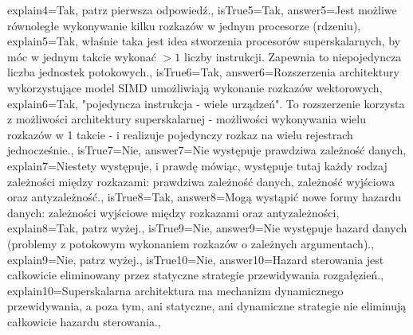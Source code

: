 \begin{enumerate}
\begin{minipage}{\textwidth}
{		explain4={Tak, patrz pierwsza odpowiedź.},%
		isTrue5={Tak},%
		answer5={Jest możliwe równoległe wykonywanie kilku rozkazów w jednym procesorze (rdzeniu)},%
		explain5={Tak, właśnie taka jest idea stworzenia procesorów superskalarnych, by móc w jednym takcie wykonać $>1$ liczby instrukcji. Zapewnia to niepojedyncza liczba jednostek potokowych.},%
		isTrue6={Tak},%
		answer6={Rozszerzenia architektury wykorzystujące model SIMD umożliwiają wykonanie rozkazów wektorowych},%
		explain6={Tak, "pojedyncza instrukcja - wiele urządzeń". To rozszerzenie korzysta z możliwości architektury superskalarnej - możliwości wykonywania wielu rozkazów w 1 takcie - i realizuje pojedynczy rozkaz na wielu rejestrach jednocześnie.},%
		isTrue7={Nie},%
		answer7={Nie występuje prawdziwa zależność danych},%
		explain7={Niestety występuje, i prawdę mówiąc, występuje tutaj każdy rodzaj zależności między rozkazami: prawdziwa zależność danych, zależność wyjściowa oraz antyzależność.},%
		isTrue8={Tak},%
		answer8={Mogą wystąpić nowe formy hazardu danych: zależności wyjściowe między rozkazami oraz antyzależności},%
		explain8={Tak, patrz wyżej.},%
		isTrue9={Nie},%
		answer9={Nie występuje hazard danych (problemy z potokowym wykonaniem rozkazów o zależnych argumentach).},%
		explain9={Nie, patrz wyżej.},%
		isTrue10={Nie},%
		answer10={Hazard sterowania jest całkowicie eliminowany przez statyczne strategie przewidywania rozgałęzień.},%
		explain10={Superskalarna architektura ma mechanizm dynamicznego przewidywania, a poza tym, ani statyczne, ani dynamiczne strategie nie eliminują całkowicie hazardu sterowania.},%
	}
\end{minipage}
\begin{minipage}{\textwidth}
\end{minipage}
\end{enumerate}
